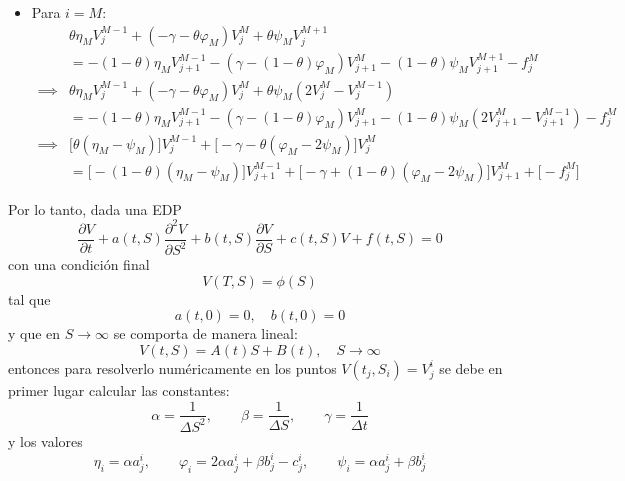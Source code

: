 \begin{itemize}
    \item Para $i=M$:
    \begin{align*}
        &\theta\eta_M V_j^{M-1} +\left( -\gamma - \theta \varphi_M \right)V_j^M +\theta\psi_M V_j^{M+1} \\
        &= - (1-\theta)\eta_M V_{j+1}^{M-1} -\left( \gamma - (1-\theta) \varphi_M \right)V_{j+1}^M - (1-\theta)\psi_M V_{j+1}^{M+1} - f_j^M \\
        \implies &\theta\eta_M V_j^{M-1} +\left( -\gamma - \theta \varphi_M \right)V_j^M +\theta\psi_M \left(2V_j^{M} - V_j^{M-1}\right) \\
        &= - (1-\theta)\eta_M V_{j+1}^{M-1} -\left( \gamma - (1-\theta) \varphi_M \right)V_{j+1}^M - (1-\theta)\psi_M \left(2V_{j+1}^{M} - V_{j+1}^{M-1}\right) - f_j^M \\
        \implies &\bigg[ \theta(\eta_M - \psi_M) \bigg] V_j^{M-1} + \bigg[ -\gamma - \theta (\varphi_M - 2\psi_M) \bigg] V_j^M\\
        &= \bigg[ - (1-\theta)(\eta_M - \psi_M) \bigg] V_{j+1}^{M-1} + \bigg[ - \gamma + (1-\theta) (\varphi_M - 2\psi_M) \bigg] V_{j+1}^M + \bigg[ - f_j^M \bigg]
    \end{align*}
\end{itemize}


Por lo tanto, dada una EDP
\begin{equation*}
    \boxed{\frac{\partial V}{\partial t} + a(t,S) \frac{\partial^2 V}{\partial S^2} + b(t,S) \frac{\partial V}{\partial S} + c(t,S) V + f(t,S) = 0}
\end{equation*}
con una condición final
\begin{equation*}
    \boxed{V(T,S) = \phi(S)}
\end{equation*}
tal que
\begin{equation*}
    \boxed{a(t,0) = 0, \quad b(t,0) = 0}
\end{equation*}
y que en $S\to\infty$ se comporta de manera lineal:
\begin{equation*}
    \boxed{V(t, S) = A(t) S + B(t), \quad S \to \infty}
\end{equation*}
entonces para resolverlo numéricamente en los puntos $V(t_j, S_i) = V_j^i$ se debe en primer lugar calcular las constantes:
\begin{equation*}
    \boxed{\alpha = \frac{1}{\Delta S^2}, \qquad \beta = \frac{1}{\Delta S}, \qquad \gamma = \frac{1}{\Delta t}}
\end{equation*}
y los valores
\begin{equation*}
    \boxed{\eta_i = \alpha a_j^i, \qquad \varphi_i = 2\alpha a_j^i  + \beta b_j^i - c_j^i, \qquad \psi_i = \alpha a_j^i + \beta b_j^i}
\end{equation*}

